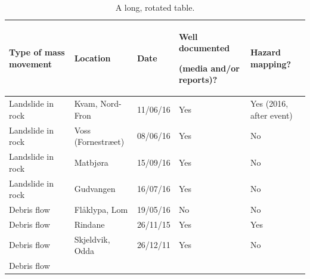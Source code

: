 \begin{landscape}
    \begin{table}[htbp]
        \centering
        \caption[Long, rotated table]{A long, rotated table.}
        \begin{tabular}
        {
            @{}
            p{} %
            p{}
            p{}
            p{}
            p{}
            @{}
        }
            \toprule
            \bfseries
            Type of mass movement
            &
            \bfseries
            Location
            &
            \bfseries
            Date
            &
            \bfseries
            Well documented\par
            (media and/or reports)?
            &
            \bfseries
            Hazard mapping?
            \\
            \midrule
            Landslide in rock
            &
            Kvam, Nord-Fron
            &
            11/06/16
            &
            Yes
            &
            Yes (2016, after event)
            \\
            Landslide in rock
            &
            Voss (Fornestræet)
            &
            08/06/16
            &
            Yes
            &
            No
            \\
            Landslide in rock
            &
            Matbjøra
            &
            15/09/16
            &
            Yes
            &
            No
            \\
            Landslide in rock
            &
            Gudvangen
            &
            16/07/16
            &
            Yes
            &
            No
            \\
            \midrule
            Debris flow
            &
            Flåklypa, Lom
            &
            19/05/16
            &
            No
            &
            No
            \\
            Debris flow
            &
            Rindane
            &
            26/11/15
            &
            Yes
            &
            Yes
            \\
            Debris flow
            &
            Skjeldvik, Odda
            &
            26/12/11
            &
            Yes
            &
            No
            \\
            Debris flow

\end{tabular}
\end{table}
\end{landscape}
